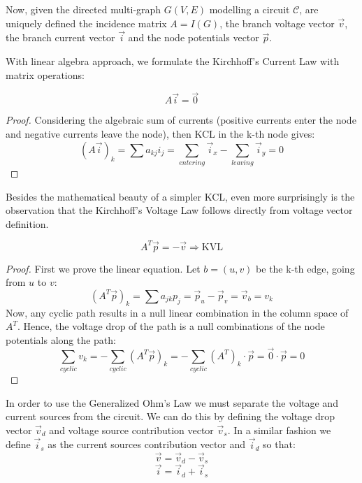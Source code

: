 \documentclass{comjnl}
\begin{document}
Now, given the directed multi-graph $G(V,E)$ modelling a circuit $\mathcal{C}$, are uniquely defined the incidence matrix $A=I(G)$, the branch voltage vector $\vec{v}$, the branch current vector $\vec{i}$ and the node potentials vector $\vec{p}$.

With linear algebra approach, we formulate the Kirchhoff's Current Law with matrix operations:
\begin{theorem}[KCL]
\label{KCL:matrix}
$$A\vec{i} = \vec{0}$$
\end{theorem}
\begin{proof}
Considering the algebraic sum of currents (positive currents enter the node and negative currents leave the node), then KCL in the k-th node gives:
$$(A\vec{i})_k = \sum a_{kj}i_j = \sum_{entering} \vec{i}_x - \sum_{leaving} \vec{i}_y = 0 $$
\end{proof}

Besides the mathematical beauty of a simpler KCL, even more surprisingly is the observation that the Kirchhoff's Voltage Law follows directly from voltage vector definition.

\begin{theorem}[KVL]
\label{KVL:matrix}
$$ A^T\vec{p}=-\vec{v} \Rightarrow \mbox{KVL}  $$
\end{theorem}
\begin{proof}
First we prove the linear equation. Let $b=(u,v)$ be the k-th edge, going from $u$ to $v$:
$$(A^T\vec{p})_k = \sum a_{jk}p_j = \vec{p}_u - \vec{p}_v = \vec{v}_b = v_k$$
Now, any cyclic path results in a null linear combination in the column space of $A^T$. Hence, the voltage drop of the path is a null combinations of the node potentials along the path:
$$ \sum_{cyclic}v_k = - \sum_{cyclic} (A^T\vec{p})_k  = - \sum_{cyclic} (A^T)_k \cdot \vec{p} = \vec{0} \cdot \vec{p} = 0$$
\end{proof}

In order to use the Generalized Ohm's Law we must separate the voltage and current sources from the circuit. We can do this by defining the voltage drop vector $\vec{v}_{d}$ and voltage source contribution vector $\vec{v}_{s}$. In a similar fashion we define $\vec{i}_{s}$ as the current sources contribution vector and $\vec{i}_{d}$ so that:
$$ \vec{v} = \vec{v}_{d} - \vec{v}_{s}$$
$$ \vec{i} = \vec{i}_{d} +  \vec{i}_{s}$$
\end{document}
